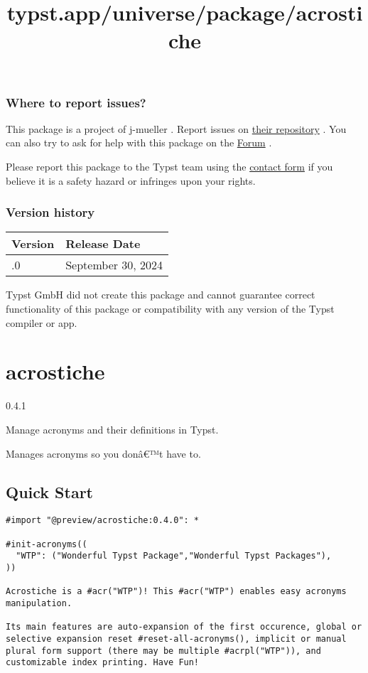 \subsubsection{Where to report issues?}\label{where-to-report-issues}

This package is a project of j-mueller . Report issues on
\href{https://github.com/j-mueller/typst-vegalite}{their repository} .
You can also try to ask for help with this package on the
\href{https://forum.typst.app}{Forum} .

Please report this package to the Typst team using the
\href{https://typst.app/contact}{contact form} if you believe it is a
safety hazard or infringes upon your rights.

\label{versions}
\subsubsection{Version history}\label{version-history}

\begin{longtable}[]{@{}ll@{}}
\toprule\noalign{}
Version & Release Date \\
\midrule\noalign{}
\endhead
\bottomrule\noalign{}
\endlastfoot
0.1.0 & September 30, 2024 \\
\end{longtable}

Typst GmbH did not create this package and cannot guarantee correct
functionality of this package or compatibility with any version of the
Typst compiler or app.


\title{typst.app/universe/package/acrostiche}

\label{banner}
\section{acrostiche}\label{acrostiche}

{ 0.4.1 }

Manage acronyms and their definitions in Typst.

\label{readme}
Manages acronyms so you donâ€™t have to.

\subsection{Quick Start}\label{quick-start}

\begin{verbatim}
#import "@preview/acrostiche:0.4.0": *

#init-acronyms((
  "WTP": ("Wonderful Typst Package","Wonderful Typst Packages"),
))

Acrostiche is a #acr("WTP")! This #acr("WTP") enables easy acronyms manipulation.

Its main features are auto-expansion of the first occurence, global or selective expansion reset #reset-all-acronyms(), implicit or manual plural form support (there may be multiple #acrpl("WTP")), and customizable index printing. Have Fun!
\end{verbatim}

